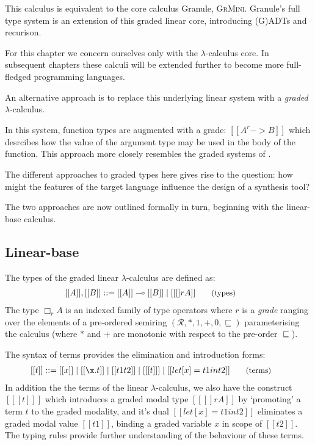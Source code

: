 This calculus is equivalent to the core calculus Granule,
\textsc{GrMini}\cite{}. Granule's full type system is an extension of this
graded linear core, introducing (G)ADTs and recurison.

For this chapter we concern ourselves only with the $\lambda$-calculus core.
In subsequent chapters these calculi will be extended further to become more
full-fledged programming languages.



An alternative approach is to replace this underlying linear system  with a
\textit{graded} $\lambda$-calculus.

In this system, function types are augmented with a grade: $[[ A ^ r -> B ]]$
which desrcibes how the value of the argument type may be used in the body of
the function. This approach more closely resembles the graded systems of
.

The different approaches to graded types here gives rise to the question: how might the
features of the target language influence the design of a synthesis tool?


The two approaches are now outlined formally in turn, beginning with the
linear-base calculus.

\subsection{Linear-base}
\label{sec:linear-base}
The types of the graded linear $\lambda$-calculus are defined as:
\begin{align*}
\hspace{-0.9em}[[ A ]] , [[ B ]] & ::=
       [[ A ]] \multimap [[ B ]]
  \mid [[ [] r A ]]
{\small{\tag{types}}}
\end{align*}
The type $\Box_{r} A$ is an indexed family of type operators where $r$ is a
\textit{grade} ranging over the elements of a pre-ordered semiring
$({\mathcal{R}}, {*}, {1}, {+}, {0},
{\sqsubseteq})$ parameterising the calculus (where $\ast$ and $+$
are monotonic with respect to the pre-order $\sqsubseteq$).

The syntax of terms provides the elimination and introduction forms:
\begin{align*}
\hspace{-0.8em} [[ t ]] ::= \;
       & [[ x ]]
  \mid [[ \x . t ]]
  \mid [[ t1 t2 ]]
  \mid [[ [t] ]]
  \mid [[ let [ x ] = t1 in t2 ]]
{\small{\tag{terms}}}
\end{align*}
In addition the the terms of the linear $\lambda$-calculus, we also have the
construct $[[ [t] ]]$ which introduces a graded modal type $[[ [] r A
]]$ by `promoting' a term $t$ to the graded modality, and it's dual $[[ let [x] = t1
in t2 ]]$ eliminates a graded modal value $[[ t1 ]]$, binding a graded variable $x$
in scope of $[[ t2 ]]$. The typing rules provide further understanding of the
behaviour of these terms.

